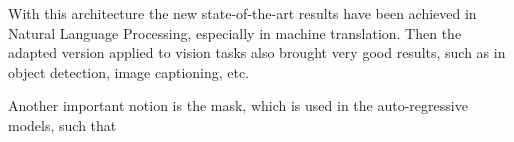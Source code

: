 With this architecture the new state-of-the-art results have been achieved in Natural Language Processing, especially in machine translation.
Then the adapted version applied to vision tasks also brought very good results, such as in object detection, image captioning, etc.

Another important notion is the mask, which is used in the auto-regressive models, such that